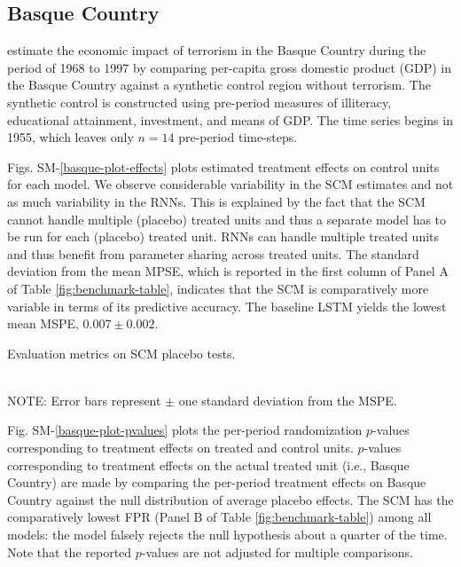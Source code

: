 \documentclass[hidelinks,12pt]{article}
\begin{document}
\subsection{Basque Country} 


\citet{abadie2003economic} estimate the economic impact of terrorism in the Basque Country during the period of 1968 to 1997 by comparing per-capita gross domestic product (GDP) in the Basque Country against a synthetic control region without terrorism. The synthetic control is constructed using pre-period measures of illiteracy, educational attainment, investment, and means of GDP. The time series begins in 1955, which leaves only $n = 14$ pre-period time-steps. 

Figs. SM-\ref{basque-plot-effects} plots estimated treatment effects on control units for each model. We observe considerable variability in the SCM estimates and not as much variability in the RNNs. This is explained by the fact that the SCM cannot handle multiple (placebo) treated units and thus a separate model has to be run for each (placebo) treated unit. RNNs can handle multiple treated units and thus benefit from parameter sharing across treated units. The standard deviation from the mean MPSE, which is reported in the first column of Panel A of Table \ref{fig:benchmark-table}, indicates that the SCM is comparatively more variable in terms of its predictive accuracy. The baseline LSTM yields the lowest mean MSPE, $0.007 \pm 0.002$. 

\begin{table}[htbp]
\begin{center}
\caption{Evaluation metrics on SCM placebo tests.\label{fig:benchmark-table}}
\resizebox{\width}{!}{}
\resizebox{\width}{!}{}\\
\footnotesize{{NOTE: Error bars represent $\pm$ one standard deviation from the MSPE.}}
\end{center}
\end{table}

Fig. SM-\ref{basque-plot-pvalues} plots the per-period randomization $p$-values corresponding to treatment effects on treated and control units. $p$-values corresponding to treatment effects on the actual treated unit (i.e., Basque Country) are made by comparing the per-period treatment effects on Basque Country against the null distribution of average placebo effects. The SCM has the comparatively lowest FPR (Panel B of Table \ref{fig:benchmark-table}) among all models: the model falsely rejects the null hypothesis about a quarter of the time. Note that the reported $p$-values are not adjusted for multiple comparisons.
\end{document}
